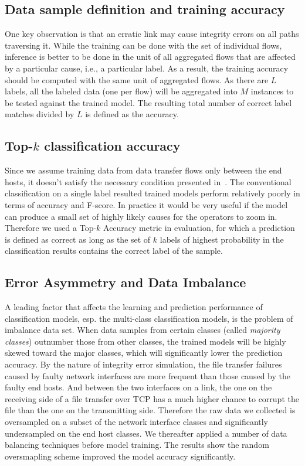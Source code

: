\subsection{Data sample definition and training accuracy}
One key observation is that an erratic link may cause integrity errors on all paths traversing it. While the training can be done with the set of individual flows, inference is better to be done in the unit of all aggregated flows that are affected by a particular cause, i.e., a particular label. As a result, the training accuracy should be computed with the same unit of aggregated flows. As there are $L$ labels, all the labeled data (one per flow) will be aggregated into $M$ instances to be tested against the trained model. The resulting total number of correct label matches divided by $L$ is defined as the accuracy.

\subsection{Top-$k$ classification accuracy} 
Since we assume training data from data transfer flows only between the end hosts, it doesn't satisfy the necessary condition presented in~\cite{netbouncer:nsdi18}. The conventional classification on a single label resulted trained models perform relatively poorly in terms of accuracy and F-score. In practice it would be very useful if the model can produce a small set of highly likely causes for the operators to zoom in. Therefore we used a Top-$k$ Accuracy metric in evaluation, for which a prediction is defined as correct as long as the set of $k$ labels of highest probability in the classification results contains the correct label of the sample.

\subsection{Error Asymmetry and Data Imbalance} 
A leading factor that affects the learning and prediction performance of classification models, esp. the multi-class classification models, is the problem of imbalance data set. When data samples from certain classes (called {\it majority classes}) outnumber those from other classes, the trained models will be highly skewed toward the major classes, which will significantly lower the prediction accuracy. By the nature of integrity error simulation, the file transfer failures caused by faulty network interfaces are more frequent than those caused by the faulty end hosts. And between the two interfaces on a link, the one on the receiving side of a file transfer over TCP has a much higher chance to corrupt the file than the one on the transmitting side. Therefore the raw data we collected is oversampled on a subset of the network interface classes and significantly undersampled on the end host classes. We thereafter applied a number of data balancing techniques before model training. The results show the random oversmapling scheme improved the model accuracy significantly.